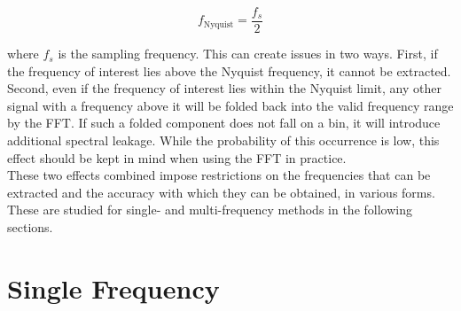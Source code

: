 \documentclass[../main]{subfiles}
\begin{document}
\begin{equation}
    f_{\text{Nyquist}} = \frac{f_s}{2}
\end{equation}

where $f_s$ is the sampling frequency. This can create issues in two ways. First, if
the frequency of interest lies above the Nyquist frequency, it cannot be extracted. Second,
even if the frequency of interest lies within the Nyquist limit, any other signal with a
frequency above it will be folded back into the valid frequency range by the FFT. If such a
folded component does not fall on a bin, it will introduce additional spectral leakage. While
the probability of this occurrence is
low, this effect should be kept in mind when using the FFT in practice.\\

These two effects combined impose restrictions on the frequencies that can be extracted and
the accuracy with which they can be obtained, in various forms. These are studied for 
single- and multi-frequency methods in the following sections. \\


\section{Single Frequency}
\end{document}
